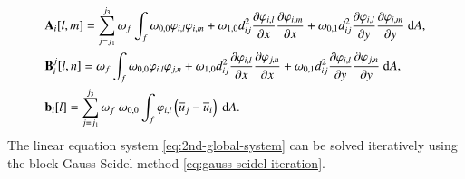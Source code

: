{\begin{equation}
    \begin{aligned}
         & \mathbf{A}_{i} [l,m]= \sum^{j_3}_{j=j_1} \omega_{f} 
           \int_{f}{ 
             \omega_{0,0}
            \varphi_{i,l}\varphi_{i,m}
            +
            \omega_{1,0} d^{2}_{ij}
            \partialderivative{\varphi_{i,l}}{x}
            \partialderivative{\varphi_{i,m}}{x}
            +
             \omega_{0,1} d^{2}_{ij}
            \partialderivative{\varphi_{i,l}}{y}
            \partialderivative{\varphi_{i,m}}{y}
            \ \dd A},
        \\
         & \mathbf{B}^j_{i} [l,n]=
        \omega_f \int_{f}{ 
             \omega_{0,0}
            \varphi_{i,l}\varphi_{j,n}
            +
            \omega_{1,0} d^{2}_{ij}
            \partialderivative{\varphi_{i,l}}{x}
            \partialderivative{\varphi_{j,n}}{x}
            +
             \omega_{0,1} d^{2}_{ij}
            \partialderivative{\varphi_{i,l}}{y}
            \partialderivative{\varphi_{j,n}}{y}
            \ \dd A},
        \\
         & \mathbf{b}_{i} [l]=
        \sum^{j_3}_{j=j_1}
        \omega_f \ \omega_{0,0}
        \int_{f}{
            \varphi_{i,l} \left(\overline{u}_j - \overline{u}_i\right)
            \ \dd A}.
    \end{aligned}
\end{equation}
The linear equation system \eqref{eq:2nd-global-system} can be solved iteratively using the block Gauss-Seidel method \eqref{eq:gauss-seidel-iteration}.
}

